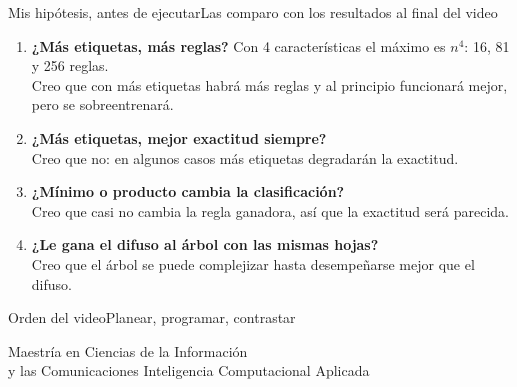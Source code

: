 \documentclass[aspectratio=169,10pt]{beamer}
\begin{document}
\begin{frame}{Mis hipótesis, antes de ejecutar}{Las comparo con los resultados al final del video}
  \begin{enumerate}\setlength{\itemsep}{8pt}
    \item \textbf{¿Más etiquetas, más reglas?} Con 4 características el máximo es $n^4$: 16, 81 y 256 reglas.\\
      {\color{UDBlue}Creo que con más etiquetas habrá más reglas y al principio funcionará mejor, pero se sobreentrenará.}
    \item \textbf{¿Más etiquetas, mejor exactitud siempre?}\\
      {\color{UDBlue}Creo que no: en algunos casos más etiquetas degradarán la exactitud.}
    \item \textbf{¿Mínimo o producto cambia la clasificación?}\\
      {\color{UDBlue}Creo que casi no cambia la regla ganadora, así que la exactitud será parecida.}
    \item \textbf{¿Le gana el difuso al árbol con las mismas hojas?}\\
      {\color{UDBlue}Creo que el árbol se puede complejizar hasta desempeñarse mejor que el difuso.}
  \end{enumerate}
\end{frame}

\begin{frame}{Orden del video}{Planear, programar, contrastar}
  \begin{center}
  \end{center}
  \vspace{0.3cm}
\end{frame}

         {Maestría en Ciencias de la Información\\y las Comunicaciones}
         {Inteligencia Computacional Aplicada}
\end{document}
